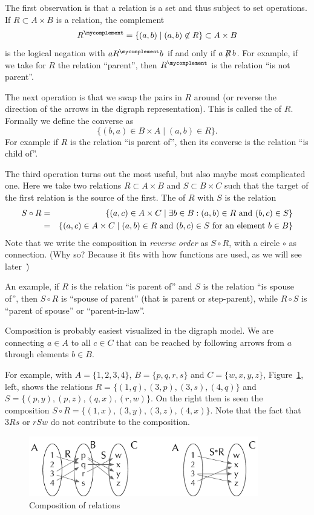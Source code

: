 The first observation is that a relation is a set and thus subject to set
operations. If $R\subset A\times B$ is a relation, the complement
\[
R^\mycomplement=\{(a,b)\mid (a,b)\not\in R\}\subset A\times B
\]
is the logical negation with $aR^\mycomplement b$ if and only if $a\not\!\!
R\, b$. For example,
if we take for $R$ the relation ``parent'', then $R^\mycomplement$ is the
relation ``is not parent''.
\medskip

The next operation is that we swap the pairs in $R$ around (or reverse the
direction of the arrows in the digraph representation). This is called the
 of $R$. Formally we define the converse as
\[
\{(b,a)\in B\times A\mid (a,b)\in R\}.
\]
For example if $R$ is the relation ``is parent of'', then its converse is
the relation ``is child of''.
\medskip

The third operation turns out the most useful, but also maybe most
complicated one. Here we take two relations $R\subset A\times B$ and
$S\subset B\times C$ such that the target of the first relation is the
source of the first. The  of $R$ with $S$ is the
relation 
\begin{eqnarray*}
S\circ R&=&\{(a,c)\in A\times C\mid \exists b\in B: (a,b)\in R\mbox{\ and\
}(b,c)\in S\}\\
&=&\{(a,c)\in A\times C\mid (a,b)\in R\mbox{\ and\ }(b,c)\in S
\mbox{\ for an element $b\in B$}\}
\end{eqnarray*}
Note that we write the composition in {\em reverse order} as $S\circ R$,
with a circle $\circ$ as connection. (Why so? Because it fits with how
functions are used, as we will see later~\pointer{secfunccomposition}\.)

An example, if $R$ is the relation ``is parent of'' and $S$ is the relation
``is spouse of'', then $S\circ R$ is ``spouse of parent'' (that is parent or
step-parent), while $R\circ S$ is ``parent of spouse'' or ``parent-in-law''.
\smallskip

Composition is probably easiest visualized in the digraph model. We are
connecting $a\in A$ to all $c\in C$ that can be reached by following arrows
from $a$ through elements $b\in B$.

For example, with $A=\{1,2,3,4\}$, $B=\{p,q,r,s\}$ and $C=\{w,x,y,z\}$,
Figure~\ref{figcompdig}, left, shows the relations
$R=\{(1,q),(3,p),(3,s),(4,q)\}$ and $S=\{(p,y),(p,z),(q,x),(r,w)\}$. On the
right then is seen the composition $S\circ R=\{(1,x),(3,y),(3,z),(4,x)\}$.
Note that the fact that $3Rs$ or $rSw$ do not contribute to the composition.
\begin{figure}[t]
\begin{center}
\includegraphics[width=10cm]{pic/CompositionDigraph.pdf}
\end{center}
\caption{Composition of relations}
\label{figcompdig}
\end{figure}


